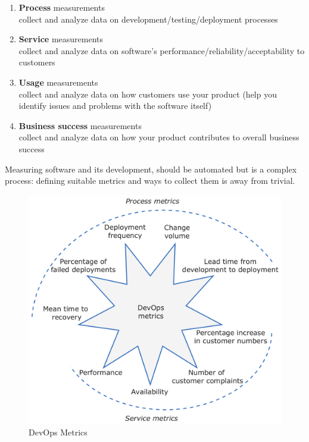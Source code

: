 \begin{enumerate}
   \item \textbf{Process} measurements\\
   collect and analyze data on development/testing/deployment processes
   \item \textbf{Service} measurements\\
   collect and analyze data on software’s performance/reliability/acceptability to customers
   \item \textbf{Usage} measurements\\
   collect and analyze data on how customers use your product
   (help you identify issues and problems with the software itself)
   \item \textbf{Business success} measurements\\
   collect and analyze data on how your product contributes to overall business success
\end{enumerate}

Measuring software and its development, should be automated but is a complex process:
defining suitable metrics and ways to collect them is away from trivial.

\begin{figure}[htbp]
   \centering
   \includegraphics{images/devops_metrics.png}
   \caption{DevOps Metrics}
   \label{fig:devops_metrics}
\end{figure}

